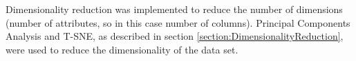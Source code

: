 
Dimensionality reduction was implemented to reduce the number of dimensions (number of attributes, so in this case number of columns). Principal Components Analysis and T-SNE, as described in section \ref{section:DimensionalityReduction}, were used to reduce the dimensionality of the data set. 